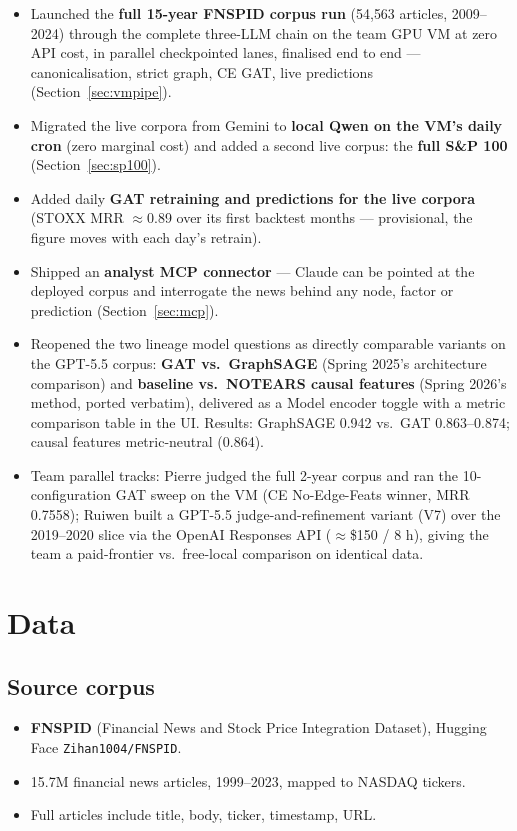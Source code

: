 \documentclass[11pt]{article}
\begin{document}
\begin{itemize}
  \item Launched the \textbf{full 15-year FNSPID corpus run} (54{,}563 articles, 2009--2024) through the complete three-LLM chain on the team GPU VM at zero API cost, in parallel checkpointed lanes, finalised end to end --- canonicalisation, strict graph, CE GAT, live predictions (Section~\ref{sec:vmpipe}).
  \item Migrated the live corpora from Gemini to \textbf{local Qwen on the VM's daily cron} (zero marginal cost) and added a second live corpus: the \textbf{full S\&P 100} (Section~\ref{sec:sp100}).
  \item Added daily \textbf{GAT retraining and predictions for the live corpora} (STOXX MRR \(\approx\)0.89 over its first backtest months --- provisional, the figure moves with each day's retrain).
  \item Shipped an \textbf{analyst MCP connector} --- Claude can be pointed at the deployed corpus and interrogate the news behind any node, factor or prediction (Section~\ref{sec:mcp}).
  \item Reopened the two lineage model questions as directly comparable variants on the GPT-5.5 corpus: \textbf{GAT vs.\ GraphSAGE} (Spring 2025's architecture comparison) and \textbf{baseline vs.\ NOTEARS causal features} (Spring 2026's method, ported verbatim), delivered as a Model encoder toggle with a metric comparison table in the UI. Results: GraphSAGE 0.942 vs.\ GAT 0.863--0.874; causal features metric-neutral (0.864).
  \item Team parallel tracks: Pierre judged the full 2-year corpus and ran the 10-configuration GAT sweep on the VM (CE No-Edge-Feats winner, MRR 0.7558); Ruiwen built a GPT-5.5 judge-and-refinement variant (V7) over the 2019--2020 slice via the OpenAI Responses API (\(\approx\)\$150 / 8 h), giving the team a paid-frontier vs.\ free-local comparison on identical data.
\end{itemize}

\section{Data}

\subsection{Source corpus}
\begin{itemize}
  \item \textbf{FNSPID} (Financial News and Stock Price Integration Dataset), Hugging Face \texttt{Zihan1004/FNSPID}.
  \item 15.7M financial news articles, 1999--2023, mapped to NASDAQ tickers.
  \item Full articles include title, body, ticker, timestamp, URL.
\end{itemize}
\end{document}
